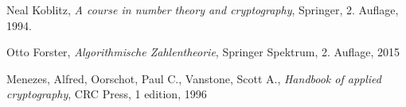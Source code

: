 \documentclass[
  a4paper,
  11pt,
]{scrartcl}
\theoremstyle{plain}
\theoremstyle{definition}
\theoremstyle{remark}
\begin{document}
\listoffigures

\begin{thebibliography}{9}
    Neal Koblitz,
    \textit{A course in number theory and cryptography},
    Springer,
    2. Auflage,
    1994.

    Otto Forster,
    \textit{Algorithmische Zahlentheorie},
    Springer Spektrum,
    2. Auflage,
    2015

    Menezes, Alfred,
    Oorschot, Paul C.,
    Vanstone, Scott A.,
    \textit{Handbook of applied cryptography},
    CRC Press,
    1 edition,
    1996
\end{thebibliography}
\end{document}
